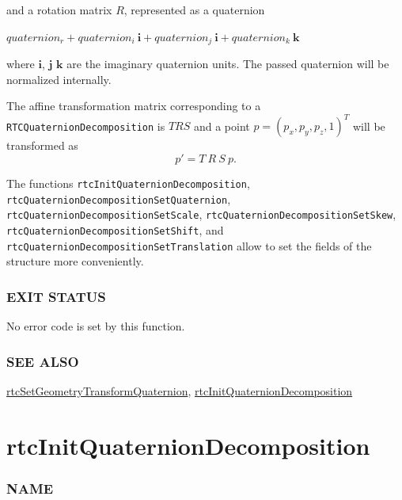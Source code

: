 and a rotation matrix \(R\), represented as a quaternion

\(quaternion_r + quaternion_i \ \mathbf{i} + quaternion_j \ \mathbf{i} + quaternion_k \ \mathbf{k}\)

where \(\mathbf{i}\), \(\mathbf{j}\) \(\mathbf{k}\) are the imaginary
quaternion units. The passed quaternion will be normalized internally.

The affine transformation matrix corresponding to a
\texttt{RTCQuaternionDecomposition} is \(TRS\) and a point
\(p = (p_x, p_y, p_z, 1)^T\) will be transformed as
\[p' = T \ R \ S \ p.\]

The functions \texttt{rtcInitQuaternionDecomposition},
\texttt{rtcQuaternionDecompositionSetQuaternion},
\texttt{rtcQuaternionDecompositionSetScale},
\texttt{rtcQuaternionDecompositionSetSkew},
\texttt{rtcQuaternionDecompositionSetShift}, and
\texttt{rtcQuaternionDecompositionSetTranslation} allow to set the
fields of the structure more conveniently.

\subsubsection{EXIT STATUS}\label{exit-status}

No error code is set by this function.

\subsubsection{SEE ALSO}\label{see-also}

\hyperref[rtcsetgeometrytransformquaternion]{rtcSetGeometryTransformQuaternion},
\hyperref[rtcinitquaterniondecomposition]{rtcInitQuaternionDecomposition}

\pagebreak

\section{rtcInitQuaternionDecomposition}\label{rtcinitquaterniondecomposition}

\subsubsection{NAME}\label{name}

\begin{Shaded}
\begin{Highlighting}[]
\OperatorTok{{-}}
\end{Highlighting}
\end{Shaded}

